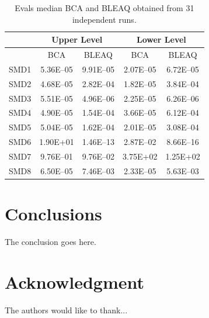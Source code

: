 \documentclass[conference]{IEEEtran}
\begin{document}
\begin{table}[!t]
\renewcommand{\arraystretch}{1.3}
    \caption{Evals median BCA and BLEAQ obtained from 31 independent runs.}
    \label{tab:leader2}
    \centering
    \begin{tabular}{|c|c|c||c|c|}
\hline
& \multicolumn{2}{c||}{Upper Level} & \multicolumn{2}{c|}{Lower Level} \\ \hline
& BCA & BLEAQ & BCA & BLEAQ \\ \hline
SMD1  & 5.36E--05 & 9.91E--05 & 2.07E--05 & 6.72E--05 \\ \hline
SMD2  & 4.68E--05 & 2.82E--04 & 1.82E--05 & 3.84E--04 \\ \hline
SMD3  & 5.51E--05 & 4.96E--06 & 2.25E--05 & 6.26E--06 \\ \hline
SMD4  & 4.90E--05 & 1.54E--04 & 3.66E--05 & 6.12E--04 \\ \hline
SMD5  & 5.04E--05 & 1.62E--04 & 2.01E--05 & 3.08E--04 \\ \hline
SMD6  &  1.90E+01 & 1.46E--13 & 2.87E--02 & 8.66E--16 \\ \hline
SMD7  & 9.76E--01 & 9.76E--02 &  3.75E+02 &  1.25E+02 \\ \hline
SMD8  & 6.50E--05 & 7.46E--03 & 2.33E--05 & 5.63E--03 \\ \hline

    \end{tabular}
\end{table}

\section{Conclusions}
The conclusion goes here.


\section*{Acknowledgment}


The authors would like to thank...\cite{deb2000efficient}











\end{document}
